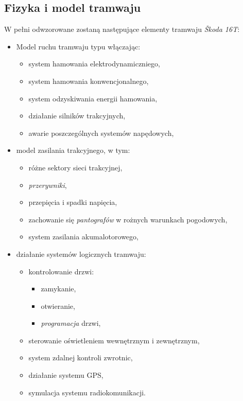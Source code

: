 \documentclass[12pt,a4paper]{article}
\begin{document}
\subsection{Fizyka i model tramwaju}
W pełni odwzorowane zostaną następujące elementy tramwaju {\it Škoda 16T}:
\begin{itemize}
\item Model ruchu tramwaju typu włączając:
	\begin{itemize}
	\item system hamowania elektrodynamiczniego,
	\item system hamowania konwencjonalnego,
	\item system odzyskiwania energii hamowania,
	\item działanie silników trakcyjnych,
	\item awarie poszczególnych systemów napędowych,
	\end{itemize}
\item model zasilania trakcyjnego, w tym:
	\begin{itemize}
	\item różne sektory sieci trakcyjnej,
	\item {\it przerywniki},
	\item przepięcia i spadki napięcia,
	\item zachowanie się {\it pantografów} w rożnych warunkach pogodowych,
	\item system zasilania akumalotorowego,
	\end{itemize}
\item działanie systemów logicznych tramwaju:
	\begin{itemize}
	\item kontrolowanie drzwi:
		\begin{itemize}
		\item zamykanie,
		\item otwieranie,
		\item {\it programacja} drzwi,
		\end{itemize}
	\item sterowanie oświetleniem wewnętrznym i zewnętrznym,
	\item system zdalnej kontroli zwrotnic,
	\item działanie systemu GPS,
	\item symulacja systemu radiokomunikacji.
	\end{itemize}
\end{itemize}
\end{document}
